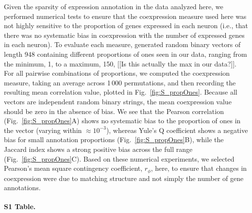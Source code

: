 \documentclass[10pt,letterpaper]{article}
\begin{document}
Given the sparsity of expression annotation in the data analyzed here, we performed numerical tests to ensure that the coexpression measure used here was not highly sensitive to the proportion of genes expressed in each neuron (i.e., that there was no systematic bias in coexpression with the number of expressed genes in each neuron).
To evaluate each measure, generated random binary vectors of length 948 containing different proportions of ones seen in our data, ranging from the minimum, 1, to a maximum, 150, [[Is this actually the max in our data?]].
For all pairwise combinations of proportions, we computed the coexpression measure, taking an average across 1\,000 permutations, and then recording the resulting mean correlation value, plotted in Fig.~\ref{fig:S_propOnes}.
Because all vectors are independent random binary strings, the mean coexpression value should be zero in the absence of bias.
We see that the Pearson correlation (Fig.~\ref{fig:S_propOnes}A) shows no systematic bias to the proportion of ones in the vector (varying within $\approx 10^{-3}$), whereas Yule's Q coefficient shows a negative bias for small annotation proportions (Fig.~\ref{fig:S_propOnes}B), while the Jaccard index shows a strong positive bias across the full range (Fig.~\ref{fig:S_propOnes}C).
Based on these numerical experiments, we selected Pearson's mean square contingency coefficient, $r_\phi$, here, to ensure that changes in coexpression were due to matching structure and not simply the number of gene annotations.

\paragraph*{S1 Table.}
\end{document}
